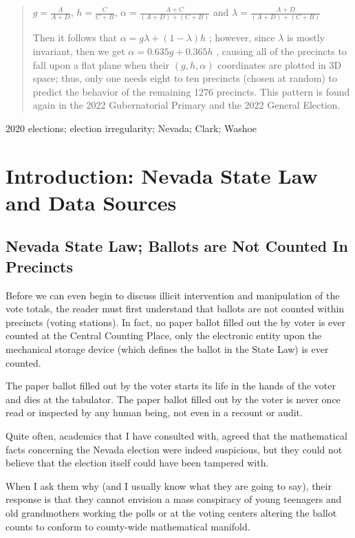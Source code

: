 \documentclass[preprint,13pt]{elsarticle}
\begin{document}
\begin{frontmatter}
\begin{abstract}
$g=\frac{A}{A+D}$, $h=\frac{C}{C+B}$, $\alpha=\frac{A+C}{(A+D)+(C+B)}$ and  $\lambda=\frac{A+D}{(A+D)+(C+B)}$

Then it follows that $\alpha=g\lambda + (1-\lambda)h$ ; however, since $\lambda$ is mostly invariant, then we get $\alpha=0.635g+0.365h$ , causing all of the precincts to fall upon a flat plane when their $(g,h,\alpha)$ coordinates are plotted in 3D space; thus, only one needs eight to ten precincts (chosen at random) to predict the behavior of the remaining 1276 precincts. This pattern is found again in the 2022 Gubernatorial Primary and the 2022 General Election.
\end{abstract}
\begin{keyword}
2020 elections; election irregularity; Nevada; Clark; Washoe

\end{keyword}
\end{frontmatter}
\tableofcontents
\newpage
\linenumbers
\section{Introduction: Nevada State Law and Data Sources}
\subsection{Nevada State Law; Ballots are Not Counted In Precincts}
Before we can even begin to discuss illicit intervention and manipulation of the vote totals, the reader must first understand that ballots are not counted within precincts (voting stations). In fact, no paper ballot filled out the by voter is ever counted at the Central Counting Place, only the electronic entity upon the mechanical storage device (which defines the ballot in the State Law) is ever counted. 

The paper ballot filled out by the voter starts its life in the hands of the voter and dies at the tabulator. The paper ballot filled out by the voter is never once read or inspected by any human being, not even in a recount or audit.

Quite often, academics that I have consulted with, agreed that the mathematical facts concerning the Nevada election were indeed suspicious, but they could not believe that the election itself could have been tampered with.

When I ask them why (and I usually know what they are going to say), their response is that they cannot envision a mass conspiracy of young teenagers and old grandmothers working the polls or at the voting centers altering the ballot counts to conform to county-wide mathematical manifold.
\end{document}
